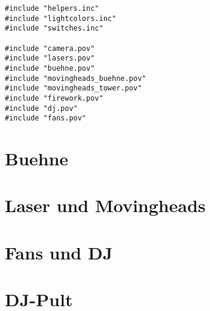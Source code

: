 \documentclass[paper=a4]{scrartcl}
\begin{document}
\begin{lstlisting}
#include "helpers.inc"
#include "lightcolors.inc"
#include "switches.inc"

#include "camera.pov"
#include "lasers.pov"
#include "buehne.pov"
#include "movingheads_buehne.pov"
#include "movingheads_tower.pov"
#include "firework.pov"
#include "dj.pov"
#include "fans.pov"
\end{lstlisting}

\section{Buehne}
\section{Laser und Movingheads}
\section{Fans und DJ}
\section{DJ-Pult}
\end{document}
